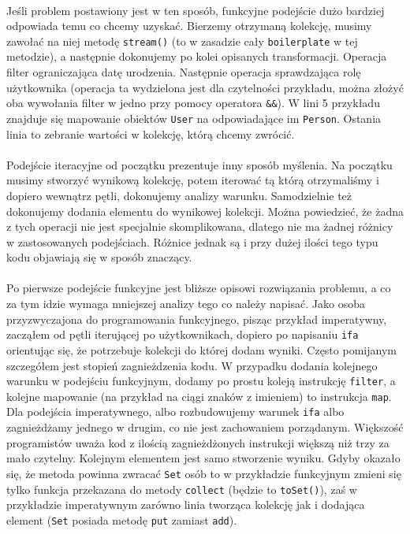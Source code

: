 \documentclass[a4paper,10pt]{report}
\begin{document}
\paragraph{}
Jeśli problem postawiony jest w ten sposób, funkcyjne podejście dużo bardziej odpowiada temu co chcemy uzyskać. Bierzemy otrzymaną kolekcję, musimy zawołać na niej metodę \verb|stream()| (to w zasadzie cały \verb|boilerplate| w tej metodzie), a następnie
dokonujemy po kolei opisanych transformacji. Operacja filter ograniczająca datę urodzenia. Następnie operacja sprawdzająca rolę użytkownika (operacja ta wydzielona jest dla czytelności przykładu, można złożyć oba wywołania filter w jedno przy pomocy operatora
\verb|&&|). W lini 5 przykładu znajduje się mapowanie obiektów \verb|User| na odpowiadające im \verb|Person|. Ostania linia to zebranie wartości w kolekcję, którą chcemy zwrócić.
\paragraph{}
Podejście iteracyjne od początku prezentuje inny sposób myślenia. Na początku musimy stworzyć wynikową kolekcję, potem iterować tą którą otrzymaliśmy i dopiero wewnątrz pętli, dokonujemy analizy warunku. Samodzielnie też dokonujemy dodania elementu do wynikowej kolekcji. Można powiedzieć, że żadna z tych operacji nie jest specjalnie skomplikowana, dlatego nie ma żadnej różnicy w zastosowanych podejściach. Różnice jednak są i przy dużej ilości tego typu kodu objawiają się w sposób znaczący.
\paragraph{}
Po pierwsze podejście funkcyjne jest bliższe opisowi rozwiązania problemu, a co za tym idzie wymaga mniejszej analizy tego co należy napisać. Jako osoba przyzwyczajona do programowania funkcyjnego, pisząc przykład imperatywny, zacząłem od pętli iterującej po użytkownikach, dopiero po napisaniu \verb|ifa| orientując się, że potrzebuje kolekcji do której dodam wyniki. Często pomijanym szczegółem jest stopień zagnieżdzenia kodu. W przypadku dodania kolejnego warunku w podejściu funkcyjnym, dodamy po prostu koleją instrukcję \verb|filter|, a kolejne mapowanie (na przykład na ciągi znaków z imieniem) to instrukcja \verb|map|. Dla podejścia imperatywnego, albo rozbudowujemy warunek \verb|ifa| albo zagnieżdżamy jednego w drugim, co nie jest zachowaniem porządanym. Większość programistów uważa kod z ilością zagnieżdżonych instrukcji większą niż trzy za mało czytelny. Kolejnym elementem jest samo stworzenie wyniku. Gdyby okazało się, że metoda powinna zwracać \verb|Set| osób to w przykładzie funkcyjnym zmieni się tylko funkcja przekazana do metody \verb|collect| (będzie to \verb|toSet()|), zaś w przykładzie imperatywnym zarówno linia tworząca kolekcję jak i dodająca element (\verb|Set| posiada metodę \verb|put| zamiast \verb|add|).
\end{document}
